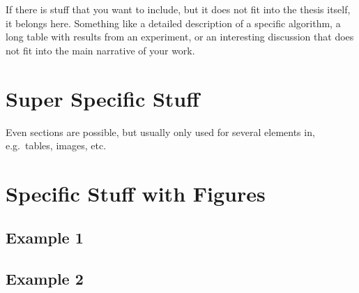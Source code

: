 If there is stuff that you want to include, but it does not fit into the thesis itself, it belongs here.
Something like a detailed description of a specific algorithm, a long table with results from an experiment, or an interesting discussion that does not fit into the main narrative of your work.

\section*{Super Specific Stuff}

Even sections are possible, but usually only used for several elements in, e.g.\ tables, images, etc.

\section*{Specific Stuff with Figures}
\subsection*{Example 1}
\subsection*{Example 2}
